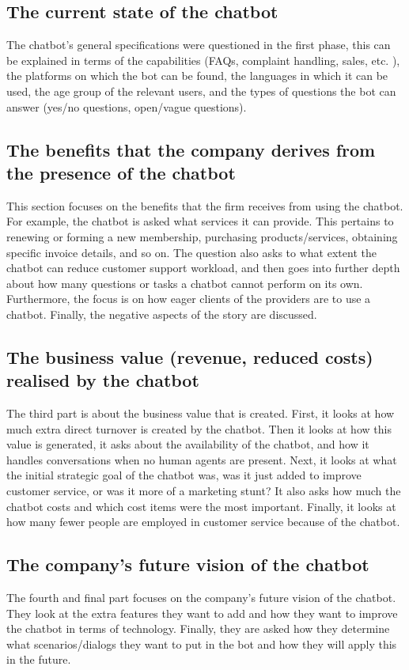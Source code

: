 \subsection{The current state of the chatbot}
The chatbot's general specifications were questioned in the first phase, this can be explained in terms of the capabilities (FAQs, complaint handling, sales, etc. ), the platforms on which the bot can be found, the languages in which it can be used, the age group of the relevant users, and the types of questions the bot can answer (yes/no questions, open/vague questions).

\subsection{The benefits that the company derives from the presence of the chatbot}
This section focuses on the benefits that the firm receives from using the chatbot. For example, the chatbot is asked what services it can provide. This pertains to renewing or forming a new membership, purchasing products/services, obtaining specific invoice details, and so on. The question also asks to what extent the chatbot can reduce customer support workload, and then goes into further depth about how many questions or tasks a chatbot cannot perform on its own. Furthermore, the focus is on how eager clients of the providers are to use a chatbot. Finally, the negative aspects of the story are discussed.

\subsection{The business value (revenue, reduced costs) realised by the chatbot}
The third part is about the business value that is created. First, it looks at how much extra direct turnover is created by the chatbot. Then it looks at how this value is generated, it asks about the availability of the chatbot, and how it handles conversations when no human agents are present. Next, it looks at what the initial strategic goal of the chatbot was, was it just added to improve customer service, or was it more of a marketing stunt?  It also asks how much the chatbot costs and which cost items were the most important. Finally, it looks at how many fewer people are employed in customer service because of the chatbot.

\subsection{The company's future vision of the chatbot}
The fourth and final part focuses on the company's future vision of the chatbot. They look at the extra features they want to add and how they want to improve the chatbot in terms of technology. Finally, they are asked how they determine what scenarios/dialogs they want to put in the bot and how they will apply this in the future.

